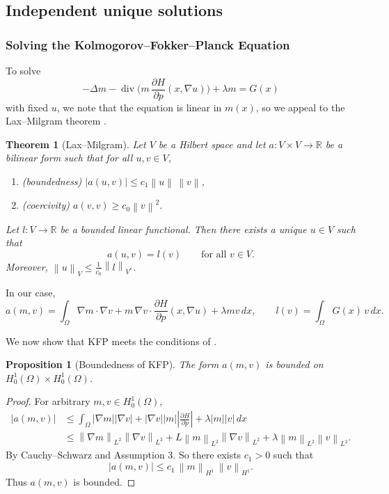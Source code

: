 \documentclass[11pt]{article}
\numberwithin{equation}{section}
\newtheorem{theorem}{Theorem}[section]
\newtheorem{proposition}[proposition]{Proposition}
\theoremstyle{definition}
\theoremstyle{remark}
\DeclareMathOperator{\diver}{div}
\newcommand{\R}{\mathbb{R}}
\newcommand{\Honez}{H_0^1(\Omega)}
\newcommand{\Hp}{\frac{\partial H}{\partial p}}
\newcommand{\norm}[1]{\left\lVert #1 \right\rVert}
\begin{document}
\subsection{Independent unique solutions}
\subsubsection{Solving the Kolmogorov--Fokker--Planck Equation}

To solve
\[
-\Delta m - \diver\!\bigl(m\,\Hp(x,\nabla u)\bigr) + \lambda m = G(x)
\]
with fixed $u$, we note that the equation is linear in $m(x)$, so we appeal to the Lax--Milgram theorem \cite{lax_milgram}.

\begin{theorem}[Lax--Milgram]\label{thm:lax-milgram}
Let $V$ be a Hilbert space and let $a:V\times V\to\R$ be a bilinear form such that for all $u,v\in V$,
\begin{enumerate}[label=(\roman*), leftmargin=*, itemsep=0.25em]
  \item (boundedness) $|a(u,v)|\le c_1\norm{u}\,\norm{v}$,
  \item (coercivity) $a(v,v)\ge c_0\norm{v}^2$.
\end{enumerate}
Let $l:V\to\R$ be a bounded linear functional. Then there exists a unique $u\in V$ such that
\[
a(u,v)=l(v)\qquad\text{for all }v\in V.
\]
Moreover, $\norm{u}_V \le \frac{1}{c_0}\norm{l}_{V^\ast}$.
\end{theorem}

In our case,
\begin{equation}\label{eq:weak_form}
a(m,v)=\int_\Omega \nabla m\cdot\nabla v + m\,\nabla v\cdot\Hp(x,\nabla u)+\lambda mv\,dx,
\qquad
l(v)=\int_\Omega G(x)\,v\,dx.
\end{equation}

We now show that KFP meets the conditions of .

\begin{proposition}[Boundedness of KFP]\label{prop:kfp-bounded}
The form $a(m,v)$ is bounded on $\Honez\times\Honez$.
\end{proposition}

\begin{proof}
For arbitrary $m,v\in\Honez$,
\begin{align*}
|a(m,v)|
&\le \int_{\Omega} |\nabla m||\nabla v| +|\nabla v||m||\Hp| + \lambda |m||v| \,dx\\
&\le \norm{\nabla m}_{L^2}\norm{\nabla v}_{L^2} + L\norm{m}_{L^2}\norm{\nabla v}_{L^2} + \lambda\norm{m}_{L^2}\norm{v}_{L^2}.
\end{align*}
By Cauchy--Schwarz and Assumption 3. So there exists $c_1>0$ such that
\[
|a(m,v)| \le c_1\,\norm{m}_{H^1}\,\norm{v}_{H^1}.
\]
Thus $a(m,v)$ is bounded.
\end{proof}
\end{document}
